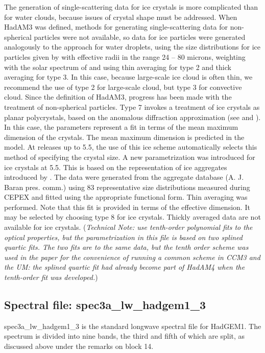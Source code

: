 The generation of single-scattering data for ice crystals is more
complicated than for water clouds, because issues of crystal shape
must be addressed. When HadAM3 was defined, methods for generating 
single-scattering data for non-spherical particles were not available,
so data for ice particles were generated analogously to the approach
for water droplets, using the size distributions
for ice particles given by \citet{Rockel91} with effective radii
in the range 24 -- 80 microns, 
weighting with the solar spectrum of \citet{Labs70}
and using thin averaging for type 2 and thick averaging for type 3. In 
this case, because large-scale ice cloud is often thin, we recommend the
use of type 2 for large-scale cloud, but type 3 for convective cloud.
Since the definition of HadAM3, progress has been made with the treatment
of non-spherical particles. Type 7 invokes a treatment of ice  crystals
as planar polycrystals, based on the anomalous diffraction approximation
(see \citet{Kristjansson99} and \citet{Kristjansson00}). 
In this case, the
parameters represent a fit in terms of the mean maximum dimension of
the crystals. The mean maximum dimension is predicted in the model. At
releases up to 5.5, the use of this ice scheme automatically selects this
method of specifying the crystal size. 
A new parametrization \citep{Edwards07} was introduced for ice crystals at 5.5. This is based
on the representation of ice aggregates introduced by \citet{Baran01}.
The data were generated from the aggregate database (A. J. Baran pres. comm.)
using 83 representative size distributions measured during CEPEX and fitted
using the appropriate functional form. Thin averaging was performed. Note
that this fit is provided in terms of the effective dimension. It may be
selected by choosing type 8 for ice crystals.
Thickly averaged data are not
available for ice crystals.
({\it Technical Note: \citet{Kristjansson00} use tenth-order polynomial
fits to the optical properties, but the parametrization
in this file is based on two
splined quartic fits. The two fits are to the same data, but the tenth
order scheme was used in the paper for the convenience of running a
common scheme in CCM3 and the UM: the splined quartic fit had already
become part of HadAM4 when the tenth-order fit was developed.}) 

\subsection*{Spectral file: spec3a\_lw\_hadgem1\_3}

spec3a\_lw\_hadgem1\_3 is the standard longwave spectral file 
for HadGEM1. The spectrum is divided into nine bands, the
third and fifth of which are split, as discussed above
under the remarks on block 14. 

